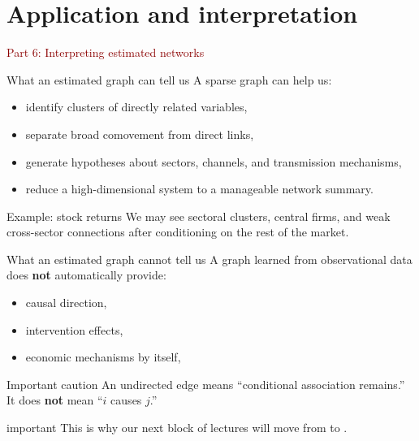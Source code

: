 \documentclass[dvipsnames,aspectratio=169,handout]{beamer}
\begin{document}

\section{Application and interpretation}

\begin{frame}{}
\begin{center}
{\Huge \textcolor{DarkRed}{Part 6: Interpreting estimated networks}}
\end{center}
\end{frame}

\begin{frame}{What an estimated graph can tell us}
A sparse graph can help us:
\begin{itemize}
    \item identify clusters of directly related variables,
    \item separate broad comovement from direct links,
    \item generate hypotheses about sectors, channels, and transmission mechanisms,
    \item reduce a high-dimensional system to a manageable network summary.
\end{itemize}

\begin{alertblock}{Example: stock returns}
We may see sectoral clusters, central firms, and weak cross-sector connections after conditioning on the rest of the market.
\end{alertblock}
\end{frame}

\begin{frame}{What an estimated graph cannot tell us}
A graph learned from observational data does \textbf{not} automatically provide:
\begin{itemize}
    \item causal direction,
    \item intervention effects,
    \item economic mechanisms by itself,
\end{itemize}

\begin{alertblock}{Important caution}
An undirected edge means ``conditional association remains.''
It does \textbf{not} mean ``$i$ causes $j$.''
\end{alertblock}

\begin{beamercolorbox}[wd=\textwidth,sep=7pt,center,rounded=true,shadow=true]{important}
This is why our next block of lectures will move from  to .
\end{beamercolorbox}
\end{frame}
\end{document}
